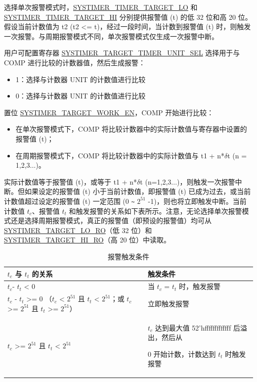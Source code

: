 \documentclass[main\_\_CN.tex]{subfiles}
\begin{document}
选择单次报警模式时，\hyperref[fielddesc:SYSTIMERTIMERTARGET0LO]{SYSTIMER\_TIMER\_TARGET\_LO} 和 \hyperref[fielddesc:SYSTIMERTIMERTARGET0HI]{SYSTIMER\_TIMER\_TARGET\_HI} 分别提供报警值 (t) 的低 32 位和高 20 位。假设当前计数值为 t2 (t2 <= t)，经过一段时间，当计数到报警值 (t) 时，则触发一次报警。与周期报警模式不同，单次报警模式仅生成一次报警中断。

用户可配置寄存器 \hyperref[fielddesc:SYSTIMERTARGET0TIMERUNITSEL]{SYSTIMER\_TARGET\_TIMER\_UNIT\_SEL} 选择用于与 COMP 进行比较的计数器值，然后生成报警：

\begin{itemize}
        \item 1：选择与计数器 UNIT 的计数值进行比较
        \item 0：选择与计数器 UNIT 的计数值进行比较
\end{itemize}

置位 \hyperref[fielddesc:SYSTIMERTARGET0WORKEN]{SYSTIMER\_TARGET\_WORK\_EN}，COMP 开始进行比较：
\begin{itemize}
    \item 在单次报警模式下，COMP 将比较计数器中的实际计数值与寄存器中设置的报警值 (t)；
    \item 在周期报警模式下，COMP 将比较计数器中的实际计数值与 t1 + n*$\delta$t (n = 1,2,3...)。
\end{itemize}

实际计数值等于报警值 (t)，或等于 t1 + n*$\delta$t (n=1,2,3...)，则触发一次报警中断。但如果设定的报警值 (t) 小于当前计数值，即报警值 (t) 已成为过去，或当前计数值超过设定的报警值  (t) 一定范围 (0 \verb+~+ $2^{51}$ -1)，则也将立即触发中断。当前计数值 $t_{c}$、报警值 $t_{t}$ 和触发报警的关系如下表所示。注意，无论选择单次报警模式还是选择周期报警模式，真正的报警值（即预设的报警值）均可从 \hyperref[fielddesc:SYSTIMERTARGET0LORO]{SYSTIMER\_TARGET\_LO\_RO}（低 32 位）和 \hyperref[fielddesc:SYSTIMERTARGET0HIRO]{SYSTIMER\_TARGET\_HI\_RO}（高 20 位）中读取。

\begin{longtable}[c]{ | p{4cm} | p{6.5cm} |}
\caption{报警触发条件}
\\\hline
\rowcolor{lightgray}
\textbf{$t_{c}$ 与 $t_{t}$ 的关系}  & \textbf{触发条件} \\ \hline
$t_{c}$- $t_{t}$ < 0 & 当 $t_{c}$ = $t_{t}$ 时，触发报警\\ \hline
$t_{c}$ - $t_{t}$ >= 0 \newline（$t_{c}$ < $2^{51}$ 且 $t_{t}$ < $2^{51}$；\newline 或 $t_{c}$ >= $2^{51}$ 且 $t_{t}$ >= $2^{51}$）& 立即触发报警\\ \hline
\multirow{2}{*}{$t_{c}$ >= $2^{51}$ 且 $t_{t}$ < $2^{51}$} & $t_{c}$ 达到最大值 52'hfffffffffffff 后溢出，然后从

0 开始计数，计数达到 $t_{t}$ 时触发报警 \\ \hline
\end{longtable}
\end{document}

